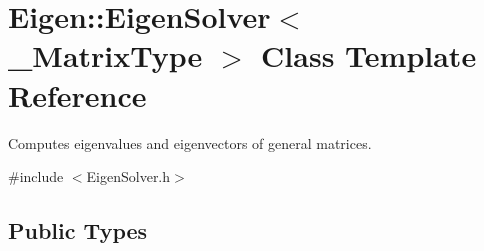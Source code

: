 \hypertarget{class_eigen_1_1_eigen_solver}{}\section{Eigen\+::Eigen\+Solver$<$ \+\_\+\+Matrix\+Type $>$ Class Template Reference}
\label{class_eigen_1_1_eigen_solver}


Computes eigenvalues and eigenvectors of general matrices.  




{\ttfamily \#include $<$Eigen\+Solver.\+h$>$}

\subsection*{Public Types}
